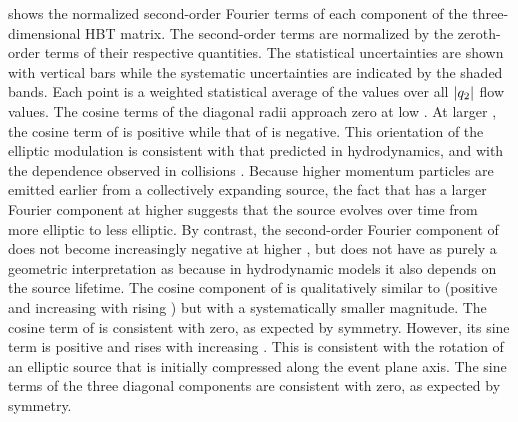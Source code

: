 \Fig{\ref{fig:uw_vs_kt}} shows the normalized second-order Fourier terms of each component of the three-dimensional \ac{HBT} matrix.
The second-order terms are normalized by the zeroth-order terms of their respective quantities.
The statistical uncertainties are shown with vertical bars while the systematic uncertainties are indicated by the shaded bands.
Each point is a weighted statistical average of the values over all $|q_{2}|$ flow values.
The cosine terms of the diagonal radii approach zero at low \kt.
At larger \kt, the cosine term of \Rside is positive while that of \Rout is negative.
This orientation of the elliptic modulation is consistent with that predicted in hydrodynamics, and with the \kt dependence observed in \PbPb collisions \cite{Adamova:2017opl}.
Because higher momentum particles are emitted earlier from a collectively expanding source, the fact that \Rside has a larger Fourier component at higher \kt suggests that the source evolves over time from more elliptic to less elliptic.
By contrast, the second-order Fourier component of \Rout does not become increasingly negative at higher \kt, but \Rout does not have as purely a geometric interpretation as \Rside because in hydrodynamic models it also depends on the source lifetime.
The cosine component of \Rlong is qualitatively similar to \Rside (positive and increasing with rising \kt) but with a systematically smaller magnitude.
The cosine term of \Ros is consistent with zero, as expected by symmetry.
However, its sine term is positive and rises with increasing \kt.
This is consistent with the rotation of an elliptic source that is initially compressed along the event plane axis.
The sine terms of the three diagonal components are consistent with zero, as expected by symmetry.
